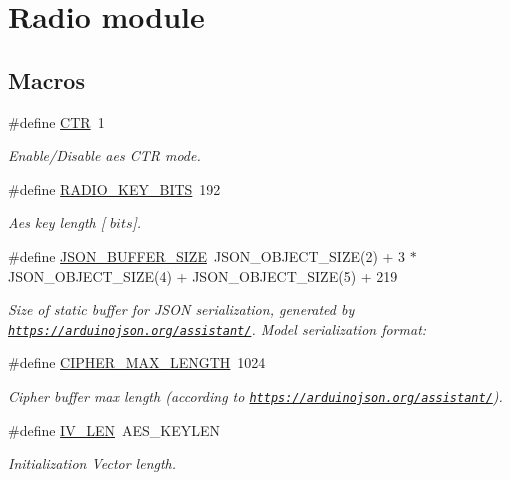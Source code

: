 \hypertarget{group___radio__module}{}\section{Radio module}
\label{group___radio__module}
\subsection*{Macros}
\begin{DoxyCompactItemize}
\item 
\mbox{\label{group___radio__module_gaa445a79fc0f7373036c72d198e51f19a}} 
\#define \mbox{\hyperlink{group___radio__module_gaa445a79fc0f7373036c72d198e51f19a}{C\+TR}}~1
\begin{DoxyCompactList}\small\item\em Enable/\+Disable aes C\+TR mode. \end{DoxyCompactList}\item 
\mbox{\label{group___radio__module_gaf0e9fea2a1fefbbf655ad908e653fa37}} 
\#define \mbox{\hyperlink{group___radio__module_gaf0e9fea2a1fefbbf655ad908e653fa37}{R\+A\+D\+I\+O\+\_\+\+K\+E\+Y\+\_\+\+B\+I\+TS}}~192
\begin{DoxyCompactList}\small\item\em Aes key length \mbox{[} $bits$\mbox{]}. \end{DoxyCompactList}\item 
\#define \mbox{\hyperlink{group___radio__module_ga2e4ba70a12e464d5b5278c18d28355f8}{J\+S\+O\+N\+\_\+\+B\+U\+F\+F\+E\+R\+\_\+\+S\+I\+ZE}}~J\+S\+O\+N\+\_\+\+O\+B\+J\+E\+C\+T\+\_\+\+S\+I\+ZE(2) + 3 $\ast$ J\+S\+O\+N\+\_\+\+O\+B\+J\+E\+C\+T\+\_\+\+S\+I\+ZE(4) + J\+S\+O\+N\+\_\+\+O\+B\+J\+E\+C\+T\+\_\+\+S\+I\+ZE(5) + 219
\begin{DoxyCompactList}\small\item\em Size of static buffer for J\+S\+ON serialization, generated by \href{https://arduinojson.org/assistant/}{\tt https\+://arduinojson.\+org/assistant/}. Model serialization format\+: \end{DoxyCompactList}\item 
\#define \mbox{\hyperlink{group___radio__module_gae634b89476ef10a9d21eacb0da28cd7b}{C\+I\+P\+H\+E\+R\+\_\+\+M\+A\+X\+\_\+\+L\+E\+N\+G\+TH}}~1024
\begin{DoxyCompactList}\small\item\em Cipher buffer max length (according to \href{https://arduinojson.org/assistant/}{\tt https\+://arduinojson.\+org/assistant/}). \end{DoxyCompactList}\item 
\mbox{\label{group___radio__module_ga35dc4d7d23c1b86227ceb68e6ebc4fc2}} 
\#define \mbox{\hyperlink{group___radio__module_ga35dc4d7d23c1b86227ceb68e6ebc4fc2}{I\+V\+\_\+\+L\+EN}}~A\+E\+S\+\_\+\+K\+E\+Y\+L\+EN
\begin{DoxyCompactList}\small\item\em Initialization Vector length. \end{DoxyCompactList}\end{DoxyCompactItemize}
